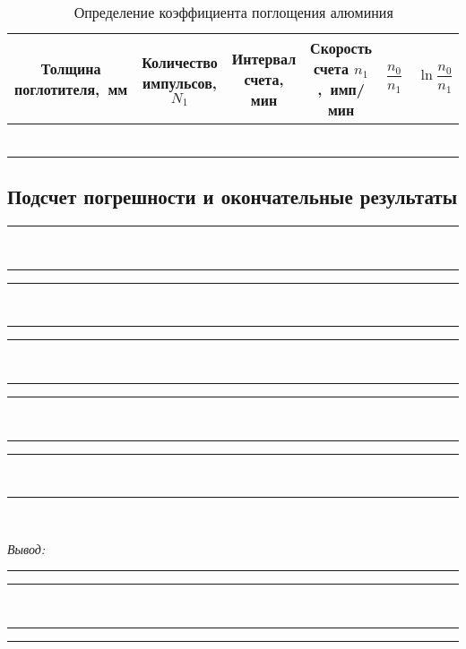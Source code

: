 \documentclass[10pt,pscyr,nonums]{hedlab}
\begin{document}
  \begin{table}[h!]
    \center
    \caption{Определение коэффициента поглощения алюминия}
    \begin{tabular}{|*{6}{C{.13}|}} \hline
      Толщина поглотителя,~мм &
        Количество импульсов, \( N_1 \) &
        Интервал счета, мин &
        Скорость счета \( n_1 \),~имп/мин &
        \( \dfrac{n_0}{n_1} \) &
        \( \ln\dfrac{n_0}{n_1} \) \\ \hline
      &&&&& \\ \hline
      &&&&& \\ \hline
      &&&&& \\ \hline
      &&&&& \\ \hline
      &&&&& \\ \hline
      &&&&& \\ \hline
    \end{tabular}
  \end{table}
  \pagebreak

  \subsection{Подсчет погрешности и окончательные результаты}
  \center
  \rule{.95\textwidth}{.5pt} \\ \rule{.95\textwidth}{.5pt}
  \rule{.95\textwidth}{.5pt} \\ \rule{.95\textwidth}{.5pt}
  \rule{.95\textwidth}{.5pt} \\ \rule{.95\textwidth}{.5pt}
  \rule{.95\textwidth}{.5pt} \\ \rule{.95\textwidth}{.5pt}
  \rule{.95\textwidth}{.5pt} \\ \rule{.95\textwidth}{.5pt} \\
  \vspace*{2em}

  \emph{Вывод:} \rule{.885\textwidth}{.5pt}
  \rule{.95\textwidth}{.5pt} \\ \rule{.95\textwidth}{.5pt}
  \rule{.95\textwidth}{.5pt}
\end{document}
